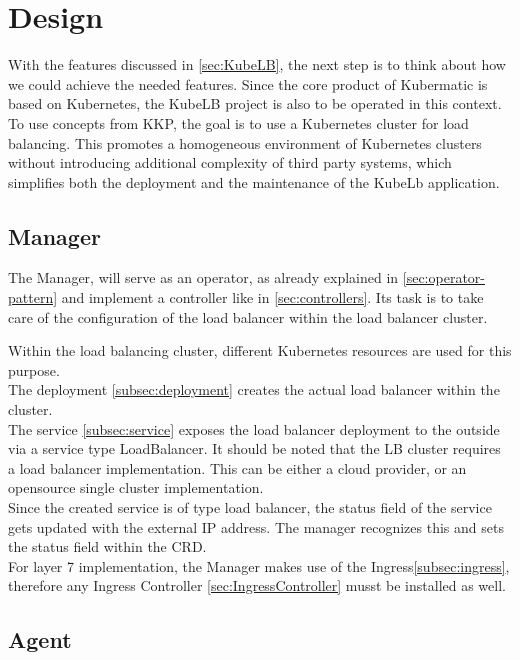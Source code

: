 \chapter{Design}

With the features discussed in \autoref{sec:KubeLB}, the next step is to think about how we could achieve the needed features.
Since the core product of Kubermatic is based on Kubernetes, the KubeLB project is also to be operated in this context.
To use concepts from KKP, the goal is to use a Kubernetes cluster for load balancing.
This promotes a homogeneous environment of Kubernetes clusters without introducing additional complexity of third party systems, which simplifies both the deployment and the maintenance of the KubeLb application.

\section{Manager}\label{sec:manager}

The Manager, will serve as an operator, as already explained in \autoref{sec:operator-pattern} and implement a controller like in \autoref{sec:controllers}.
Its task is to take care of the configuration of the load balancer within the load balancer cluster.

Within the load balancing cluster, different Kubernetes resources are used for this purpose.
\\
The deployment \autoref{subsec:deployment} creates the actual load balancer within the cluster.
\\
The service \autoref{subsec:service} exposes the load balancer deployment to the outside via a service type LoadBalancer.
It should be noted that the LB cluster requires a load balancer implementation.
This can be either a cloud provider, or an opensource single cluster implementation.
\\
Since the created service is of type load balancer, the status field of the service gets updated with the external IP address.
The manager recognizes this and sets the status field within the CRD.
\\
For layer 7 implementation, the Manager makes use of the Ingress\autoref{subsec:ingress}, therefore any Ingress Controller \autoref{sec:IngressController} musst be installed as well.

\section{Agent}\label{sec:agent}

